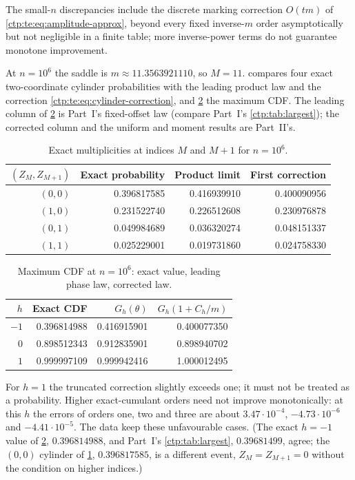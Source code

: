 \documentclass[11pt,a4paper]{article}
\numberwithin{equation}{section}
\theoremstyle{definition}
\theoremstyle{remark}
\begin{document}
The small-$n$ discrepancies include the discrete marking correction $O(tm)$
of \eqref{ctp:te:eq:amplitude-approx}, beyond every fixed inverse-$m$ order
asymptotically but not negligible in a finite table; more inverse-power terms
do not guarantee monotone improvement.

At $n=10^6$ the saddle is $m\approx11.3563921110$, so $M=11$.
 compares four exact two-coordinate cylinder
probabilities with the leading product law and the correction
\eqref{ctp:te:eq:cylinder-correction}, and \cref{ctp:te:tab:max} the maximum
CDF. The leading column of \cref{ctp:te:tab:max} is Part~I's fixed-offset law
(compare Part~I's \cref{ctp:tab:largest}); the corrected column and the
uniform and moment results are Part~II's.

\begin{table}[htbp]
\centering\small
\caption{Exact multiplicities at indices $M$ and $M+1$ for $n=10^6$.}
\label{ctp:te:tab:cutoff}
\begin{tabular}{rrrr}
\toprule
$(Z_M,Z_{M+1})$ & Exact probability & Product limit & First correction\\
\midrule
$(0,0)$ & 0.396817585 & 0.416939910 & 0.400090956\\
$(1,0)$ & 0.231522740 & 0.226512608 & 0.230976878\\
$(0,1)$ & 0.049984689 & 0.036320274 & 0.048151337\\
$(1,1)$ & 0.025229001 & 0.019731860 & 0.024758330\\
\bottomrule
\end{tabular}
\end{table}

\begin{table}[htbp]
\centering\small
\caption{Maximum CDF at $n=10^6$: exact value, leading phase law, corrected law.}
\label{ctp:te:tab:max}
\begin{tabular}{rrrr}
\toprule
$h$ & Exact CDF & $G_h(\theta)$ & $G_h(1+C_h/m)$\\
\midrule
$-1$ & 0.396814988 & 0.416915901 & 0.400077350\\
$0$ & 0.898512343 & 0.912835901 & 0.898940702\\
$1$ & 0.999997109 & 0.999942416 & 1.000012495\\
\bottomrule
\end{tabular}
\end{table}

For $h=1$ the truncated correction slightly exceeds one; it must not be
treated as a probability. Higher exact-cumulant orders need not improve
monotonically: at this $h$ the errors of orders one, two and three are about
$3.47\cdot10^{-4}$, $-4.73\cdot10^{-6}$ and $-4.41\cdot10^{-5}$. The data keep
these unfavourable cases. (The exact $h=-1$ value of
\cref{ctp:te:tab:max}, $0.396814988$, and Part~I's \cref{ctp:tab:largest},
$0.39681499$, agree; the $(0,0)$ cylinder of \cref{ctp:te:tab:cutoff},
$0.396817585$, is a different event, $Z_M=Z_{M+1}=0$ without the condition on
higher indices.)
\end{document}
